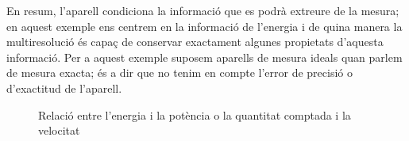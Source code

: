 \begin{example}
  En resum, l'aparell condiciona la informació que es podrà extreure
  de la mesura; en aquest exemple ens centrem en la informació de
  l'energia i de quina manera la multiresolució és capaç de conservar
  exactament algunes propietats d'aquesta informació.  Per a aquest
  exemple suposem aparells de mesura ideals quan parlem de mesura
  exacta; és a dir que no tenim en compte l'error de precisió o
  d'exactitud de l'aparell.

 



\begin{figure}[tp]
  \centering


      \caption{Relació entre l'energia i la potència o la quantitat
        comptada i la velocitat}
  \label{fig:multiresolucio:energia-potencia}
\end{figure}





\end{example}
